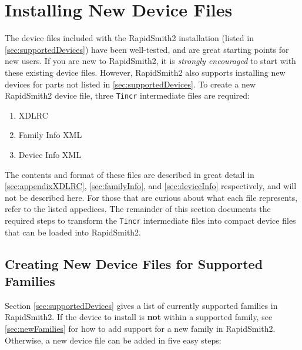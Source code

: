 \newpage
\section{Installing New Device Files} \label{sec:installingNewDevices}
The device files included with the RapidSmith2 installation (listed in
\autoref{sec:supportedDevices}) have been well-tested, and are great starting
points for new users. If you are new to RapidSmith2, it is \textit{strongly
encouraged} to start with these existing device files. However, RapidSmith2
also supports installing new devices for parts not listed in
\autoref{sec:supportedDevices}. To create a new RapidSmith2 device
file, three \texttt{Tincr} intermediate files are required:

\begin{enumerate}
  \item XDLRC
  \item Family Info XML
  \item Device Info XML
\end{enumerate}

\noindent The contents and format of these files are described in great detail
in \autoref{sec:appendixXDLRC}, \autoref{sec:familyInfo}, and
\autoref{sec:deviceInfo} respectively, and will not be described here. For those
that are curious about what each file represents, refer to the listed
appedices. The remainder of this section documents the required steps to
transform the \texttt{Tincr} intermediate files into compact device files that
can be loaded into RapidSmith2.

\subsection{Creating New Device Files for Supported Families}
\label{sec:creatingNewSupportedDevices} 
Section \ref{sec:supportedDevices} gives a list of currently supported
families in RapidSmith2. If the device to install is \textbf{not} within a
supported family, see \autoref{sec:newFamilies} for how to add support for a
new family in RapidSmith2. Otherwise, a new device file can be added in five
easy steps:

